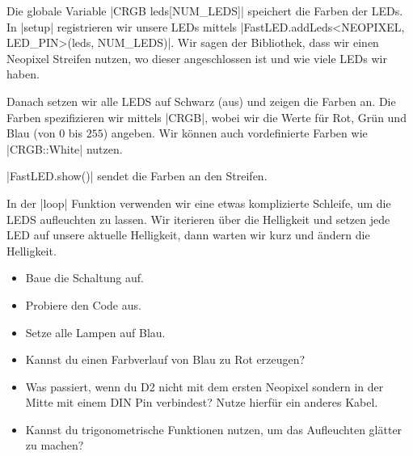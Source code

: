 \documentclass[a4paper,12pt]{book}
\begin{document}
Die globale Variable |CRGB leds[NUM_LEDS]| speichert die Farben der LEDs.
In |setup| registrieren wir unsere LEDs mittels |FastLED.addLeds<NEOPIXEL, LED_PIN>(leds, NUM_LEDS)|.
Wir sagen der Bibliothek, dass wir einen Neopixel Streifen nutzen, wo dieser angeschlossen ist und wie viele LEDs wir haben.

Danach setzen wir alle LEDS auf Schwarz (aus) und zeigen die Farben an.
Die Farben spezifizieren wir mittels |CRGB|, wobei wir die Werte für Rot, Grün und Blau (von $0$ bis $255$) angeben.
Wir können auch vordefinierte Farben wie |CRGB::White| nutzen.

|FastLED.show()| sendet die Farben an den Streifen.

In der |loop| Funktion verwenden wir eine etwas komplizierte Schleife, um die LEDS aufleuchten zu lassen.
Wir iterieren über die Helligkeit und setzen jede LED auf unsere aktuelle Helligkeit, dann warten wir kurz und ändern die Helligkeit.

\begin{center}
\end{center}

\begin{instruction}
  \begin{itemize}
    \item Baue die Schaltung auf.
    \item Probiere den Code aus.
    \item Setze alle Lampen auf Blau.
    \item Kannst du einen Farbverlauf von Blau zu Rot erzeugen?
    \item Was passiert, wenn du D2 nicht mit dem ersten Neopixel sondern in der Mitte mit einem DIN Pin verbindest? Nutze hierfür ein anderes Kabel.
    \item Kannst du trigonometrische Funktionen nutzen, um das Aufleuchten glätter zu machen?
  \end{itemize}
\end{instruction}
\end{document}
